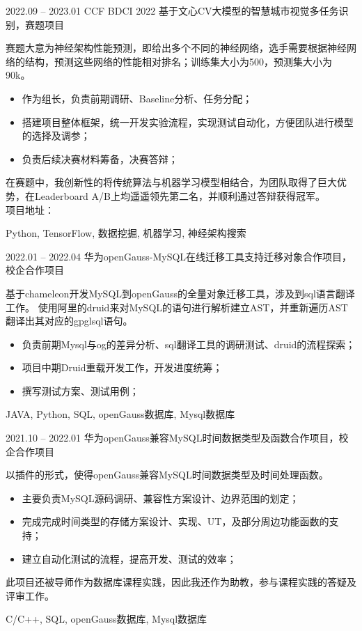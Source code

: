 %
%



\begin{experiences}
  \experiencenew
  {2022.09 -- 2023.01} {CCF BDCI 2022 基于文心CV大模型的智慧城市视觉多任务识别，赛题项目}
  {
    赛题大意为神经架构性能预测，即给出多个不同的神经网络，选手需要根据神经网络的结构，预测这些网络的性能相对排名；训练集大小为500，预测集大小为90k。
    \begin{itemize}
      \item  作为组长，负责前期调研、Baseline分析、任务分配；
      \item  搭建项目整体框架，统一开发实验流程，实现测试自动化，方便团队进行模型的选择及调参；
      \item  负责后续决赛材料筹备，决赛答辩；
    \end{itemize}
    在赛题中，我创新性的将传统算法与机器学习模型相结合，为团队取得了巨大优势，在Leaderboard A/B上均遥遥领先第二名，并顺利通过答辩获得冠军。 \\
    项目地址：
  }
  {Python, TensorFlow, 数据挖掘, 机器学习, 神经架构搜索}
  \emptySeparator

  \experiencenew
  {2022.01 -- 2022.04} {华为openGauss-MySQL在线迁移工具支持迁移对象合作项目，校企合作项目}
  {
    基于chameleon开发MySQL到openGauss的全量对象迁移工具，涉及到sql语言翻译工作。
    使用阿里的druid来对MySQL的语句进行解析建立AST，并重新遍历AST翻译出其对应的gpglsql语句。
    \begin{itemize}
      \item  负责前期Mysql与og的差异分析、sql翻译工具的调研测试、druid的流程探索；
      \item  项目中期Druid重载开发工作，开发进度统筹；
      \item  撰写测试方案、测试用例；
    \end{itemize}
  }
  {JAVA, Python, SQL, openGauss数据库, Mysql数据库}
  \emptySeparator

  \experiencenew
  {2021.10 -- 2022.01} {华为openGauss兼容MySQL时间数据类型及函数合作项目，校企合作项目}
  {
    以插件的形式，使得openGauss兼容MySQL时间数据类型及时间处理函数。
    \begin{itemize}
      \item  主要负责MySQL源码调研、兼容性方案设计、边界范围的划定；
      \item  完成完成时间类型的存储方案设计、实现、UT，及部分周边功能函数的支持；
      \item  建立自动化测试的流程，提高开发、测试的效率；
    \end{itemize}
    此项目还被导师作为数据库课程实践，因此我还作为助教，参与课程实践的答疑及评审工作。
  }
  {C/C++, SQL, openGauss数据库, Mysql数据库}


\end{experiences}

